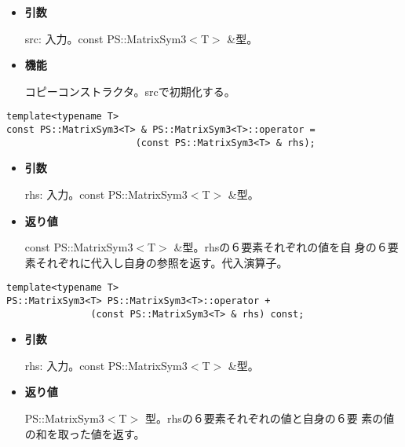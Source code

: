 \begin{itemize}

\item{{\bf 引数}}

{src}: 入力。{const PS::MatrixSym3$<$T$>$ \&}型。

\item{{\bf 機能}}

コピーコンストラクタ。{src}で初期化する。

\end{itemize}


\begin{screen}
\begin{verbatim}
template<typename T>
const PS::MatrixSym3<T> & PS::MatrixSym3<T>::operator = 
                       (const PS::MatrixSym3<T> & rhs);
\end{verbatim}
\end{screen}

\begin{itemize}

\item{{\bf 引数}}

{rhs}: 入力。{const PS::MatrixSym3$<$T$>$ \&}型。

\item{{\bf 返り値}}

{const PS::MatrixSym3$<$T$>$ \&}型。{rhs}の６要素それぞれの値を自
身の６要素それぞれに代入し自身の参照を返す。代入演算子。

\end{itemize}


\begin{screen}
\begin{verbatim}
template<typename T>
PS::MatrixSym3<T> PS::MatrixSym3<T>::operator + 
               (const PS::MatrixSym3<T> & rhs) const;
\end{verbatim}
\end{screen}

\begin{itemize}

\item{{\bf 引数}}

{rhs}: 入力。{const PS::MatrixSym3$<$T$>$ \&}型。

\item{{\bf 返り値}}

{PS::MatrixSym3$<$T$>$ }型。{rhs}の６要素それぞれの値と自身の６要
素の値の和を取った値を返す。

\end{itemize}

